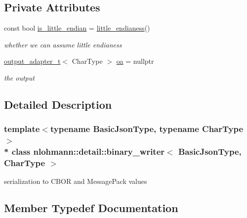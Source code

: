 \subsection*{Private Attributes}
\begin{DoxyCompactItemize}
\item 
const bool \hyperlink{classnlohmann_1_1detail_1_1binary__writer_a048887c907afe39759b777e8c888414c}{is\+\_\+little\+\_\+endian} = \hyperlink{namespacenlohmann_1_1detail_ad2860d9bcd96cd7b8258a5b94674508c}{little\+\_\+endianess}()
\begin{DoxyCompactList}\small\item\em whether we can assume little endianess \end{DoxyCompactList}\item 
\hyperlink{namespacenlohmann_1_1detail_a0fd8edff7729aa2dd92b070964bade2e}{output\+\_\+adapter\+\_\+t}$<$ Char\+Type $>$ \hyperlink{classnlohmann_1_1detail_1_1binary__writer_a6f15b782a7900f50ef37d123008e601b}{oa} = nullptr
\begin{DoxyCompactList}\small\item\em the output \end{DoxyCompactList}\end{DoxyCompactItemize}


\subsection{Detailed Description}
\subsubsection*{template$<$typename Basic\+Json\+Type, typename Char\+Type$>$\\*
class nlohmann\+::detail\+::binary\+\_\+writer$<$ Basic\+Json\+Type, Char\+Type $>$}

serialization to C\+B\+OR and Message\+Pack values 

\subsection{Member Typedef Documentation}
